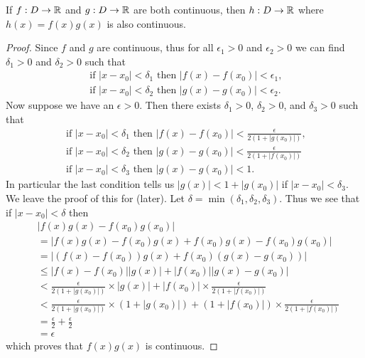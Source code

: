 \begin{proposition}\label{prop-product-of-continuous-functions-is-continuous}
    If $f: D \to \mathbb{R}$ and $g: D \to \mathbb{R}$ are both continuous, then $h: D \to \mathbb{R}$ where $h(x) = f(x)g(x)$ is also continuous.
\end{proposition}
\begin{proof}
    Since $f$ and $g$ are continuous, thus for all $\epsilon_1 > 0$ and $\epsilon_2 > 0$ we can find $\delta_1 > 0$ and $\delta_2 > 0$ such that
    \begin{gather*}
        \text{ if } |x - x_0| < \delta_1 \text{ then } |f(x) - f(x_0)| < \epsilon_1,\\
        \text{ if } |x - x_0| < \delta_2 \text{ then } |g(x) - g(x_0)| < \epsilon_2.
    \end{gather*}
    Now suppose we have an $\epsilon > 0$. Then there exists $\delta_1 > 0$, $\delta_2 > 0$, and $\delta_3 > 0$ such that
    \begin{gather*}
        \text{ if } |x - x_0| < \delta_1 \text{ then } |f(x) - f(x_0)| < \frac{\epsilon}{2(1+|g(x_0)|)},\\
        \text{ if } |x - x_0| < \delta_2 \text{ then } |g(x) - g(x_0)| < \frac{\epsilon}{2(1+|f(x_0)|)}\\
        \text{ if } |x - x_0| < \delta_3 \text{ then } |g(x) - g(x_0)| < 1.
    \end{gather*}
    In particular the last condition tells us $|g(x)| < 1 + |g(x_0)|$ if $|x - x_0| < \delta_3$. We leave the proof of this for  (later). Let $\delta = \min(\delta_1, \delta_2, \delta_3)$. Thus we see that if $|x - x_0| < \delta$ then
    \begin{align*}
        &|f(x)g(x) - f(x_0)g(x_0)|\\
        &= |f(x)g(x) - f(x_0)g(x) + f(x_0)g(x) - f(x_0)g(x_0)|\\
        &= |(f(x) - f(x_0))g(x) + f(x_0)(g(x)-g(x_0))|\\
        &\leq |f(x)-f(x_0)||g(x)| + |f(x_0)||g(x) - g(x_0)|\\
        &< \frac{\epsilon}{2(1+|g(x_0)|)}\times|g(x)| + |f(x_0)|\times\frac{\epsilon}{2(1+|f(x_0)|)}\\
        &< \frac{\epsilon}{2(1+|g(x_0)|)}\times(1 + |g(x_0)|) + (1 + |f(x_0)|)\times\frac{\epsilon}{2(1+|f(x_0)|)}\\
        &= \frac\epsilon2 + \frac\epsilon2\\
        &= \epsilon
    \end{align*}
    which proves that $f(x)g(x)$ is continuous.
\end{proof}

